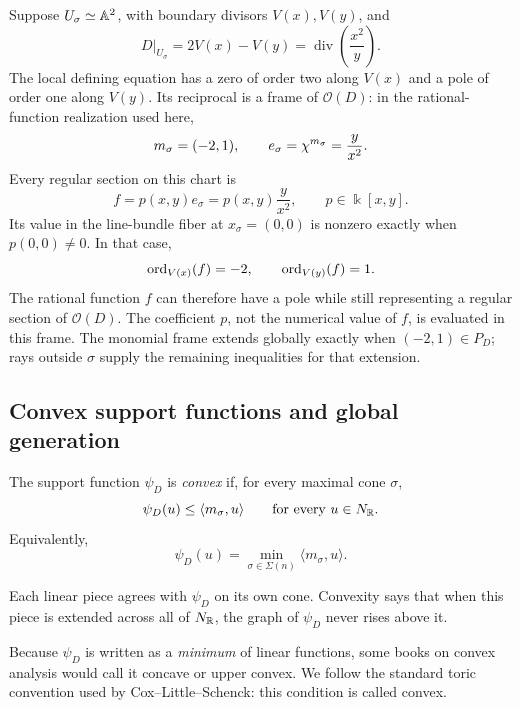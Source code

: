 \begin{example}
\label{ex:classroom-reciprocal-frame}
Suppose \(U_\sigma\simeq\mathbb{A}^2\), with boundary divisors
\(V(x),V(y)\), and
\[
D|_{U_\sigma}=2V(x)-V(y)
=\operatorname{div}\!\left(\frac{x^2}{y}\right).
\]
The local defining equation has a zero of order two along \(V(x)\)
and a pole of order one along \(V(y)\). Its reciprocal is a frame of
\(\mathcal O(D)\): in the rational-function realization used here,
\[
m_\sigma=(-2,1),\qquad e_\sigma=\chi^{m_\sigma}=\frac{y}{x^2}.
\]
Every regular section on this chart is
\[
f=p(x,y)e_\sigma=p(x,y)\frac{y}{x^2},
\qquad p\in\Bbbk[x,y].
\]
Its value in the line-bundle fiber at \(x_\sigma=(0,0)\) is nonzero
exactly when \(p(0,0)\ne0\). In that case,
\[
\operatorname{ord}_{V(x)}(f)=-2,\qquad \operatorname{ord}_{V(y)}(f)=1.
\]
The rational function \(f\) can therefore have a pole while still
representing a regular section of \(\mathcal O(D)\). The coefficient
\(p\), not the numerical value of \(f\), is evaluated in this frame.
The monomial frame extends globally exactly when
\((-2,1)\in P_D\); rays outside \(\sigma\) supply the remaining
inequalities for that extension.
\end{example}

\subsection{Convex support functions and global generation}

\begin{definition}
\label{def:toric-convex-support-function}
The support function \(\psi_D\) is \emph{convex} if, for every maximal
cone \(\sigma\),
\[
\psi_D(u)\leq\langle m_\sigma,u\rangle
\qquad
\text{for every }u\in N_{\mathbb{R}}.
\]
Equivalently,
\[
\psi_D(u)
=
\min_{\sigma\in\Sigma(n)}
\langle m_\sigma,u\rangle.
\]
\end{definition}

Each linear piece agrees with \(\psi_D\) on its own cone. Convexity
says that when this piece is extended across all of \(N_{\mathbb{R}}\), the
graph of \(\psi_D\) never rises above it.

\begin{warningbox}
Because \(\psi_D\) is written as a \emph{minimum} of linear
functions, some books on convex analysis would call it concave or
upper convex. We follow the standard toric convention used by
Cox--Little--Schenck: this condition is called convex.
\end{warningbox}


